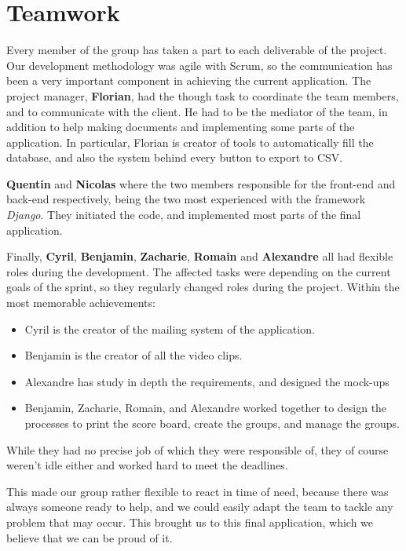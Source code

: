 \section{Teamwork}
\label{sec:Teamwork}


Every member of the group has taken a part to each deliverable of the project.
Our development methodology was agile with Scrum, so the communication has
been a very important component in achieving the current application.
The project manager, \textbf{Florian}, had the though task to coordinate the
team members, and to communicate with the client. He had to be the mediator of
the team, in addition to help making documents and implementing some parts of
the application. In particular, Florian is creator of tools to automatically
fill the database, and also the system behind every button to export to CSV.\newline

\textbf{Quentin} and \textbf{Nicolas} where the two members responsible for
the front-end and back-end respectively, being the two most experienced with
the framework \textit{Django}. They initiated the code, and implemented most
parts of the final application.\newline

Finally, \textbf{Cyril}, \textbf{Benjamin}, \textbf{Zacharie}, \textbf{Romain}
and \textbf{Alexandre} all had flexible roles during the development.
The affected tasks were depending on the current goals of the sprint,
so they regularly changed roles during the project.
Within the most memorable achievements:

\begin{itemize}
\item Cyril is the creator of the mailing system of the application.
\item Benjamin is the creator of all the video clips.
\item Alexandre has study in depth the requirements, and designed the mock-ups
\item Benjamin, Zacharie, Romain, and Alexandre worked together to design the
processes to print the score board, create the groups, and manage the groups.
\end{itemize}
\bigskip

While they had no precise job of which they were responsible of, they of course
weren't idle either and worked hard to meet the deadlines.\newline

This made our group rather flexible to react in time of need, because there was
always someone ready to help, and we could easily adapt the team to tackle any
problem that may occur. This brought us to this final application, which we
believe that we can be proud of it.

